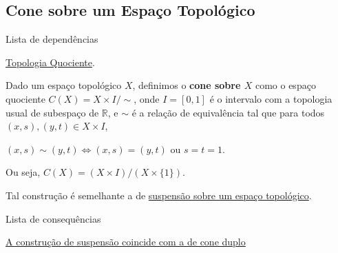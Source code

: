 \subsection{Cone sobre um Espaço Topológico}
\label{cone-def}
\begin{titlemize}{Lista de dependências}
	\item \hyperref[topologia-quociente-def]{Topologia Quociente}.
\end{titlemize}

\begin{defi}[Cone]
    Dado um espaço topológico $X$, definimos o \textbf{cone sobre $X$} como o espaço quociente $C(X) = X\times I/\sim$,
    onde $I=[0,1]$ é o intervalo com a topologia usual de subespaço de $\mathbb{R}$, e $\sim$ é a relação de equivalência tal que para todos $(x,s),(y,t) \in X\times I$,\\
    \centerline{
    $(x,s)\sim(y,t) \Leftrightarrow (x,s)=(y,t)$ ou $s=t=1$.}
    Ou seja, $C(X) = (X\times I)/(X\times \{1\})$.
\end{defi}

Tal construção é semelhante a de \hyperref[suspensao-def]{suspensão sobre um espaço topológico}.

\begin{titlemize}{Lista de consequências}
    \item \hyperref[suspensao-cone-duplo-prop]{A construção de suspensão coincide com a de cone duplo}
\end{titlemize}